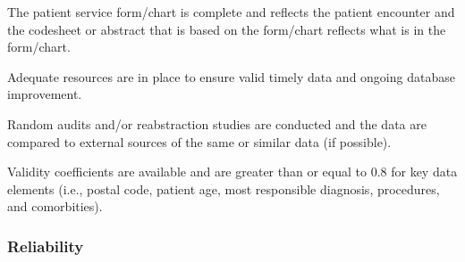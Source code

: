 \begin{QandA}
    \item The patient service form/chart is complete and reflects the patient encounter and the codesheet or abstract that is based on the form/chart reflects what is in the form/chart.
    \begin{answered}
        
    \end{answered}

    \item Adequate resources are in place to ensure valid timely data and ongoing database improvement.
    \begin{answered}
        
    \end{answered}

    \item Random audits and/or reabstraction studies are conducted and the data are compared to external sources of the same or similar data (if possible).
    \begin{answered}
        
    \end{answered}

    \item Validity coefficients are available and are greater than or equal to 0.8 for key data elements (i.e., postal code, patient age, most responsible diagnosis, procedures, and comorbities).
    \begin{answered}
        
    \end{answered}

\end{QandA}

\subsubsection{Reliability}

